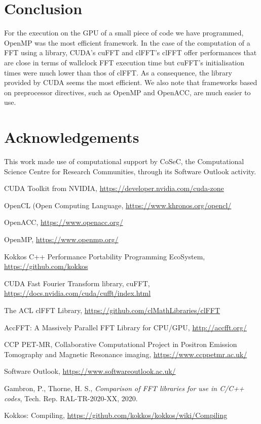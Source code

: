 \documentclass[12pt, a4paper]{article}
\begin{document}
\section{Conclusion}
For the execution on the GPU of a small piece of code we have
programmed, OpenMP was the most efficient framework. In the case of
the computation of a FFT using a library, CUDA's cuFFT and clFFT's
clFFT offer performances that are close in terms of wallclock FFT
execution time but cuFFT's initialisation times were much lower than
thos of clFFT. As a consequence, the library provided by CUDA seems
the most efficient. We also note that frameworks based on preprocessor
directives, such as OpenMP and OpenACC, are much easier to use.

\section*{Acknowledgements}
This work made use of computational support by CoSeC, the
Computational Science Centre for Research Communities, through its
Software Outlook activity.

\begin{thebibliography}{9}

 CUDA Toolkit from NVIDIA, \url{https://developer.nvidia.com/cuda-zone}

 OpenCL (Open Computing Language, \url{https://www.khronos.org/opencl/}

 OpenACC, \url{https://www.openacc.org/}
  
 OpenMP, \url{https://www.openmp.org/}

 Kokkos C++ Performance Portability Programming EcoSystem,
\url{https://github.com/kokkos}

 CUDA Fast Fourier Transform library, cuFFT, \url{https://docs.nvidia.com/cuda/cufft/index.html}

 The ACL clFFT Library, \url{https://github.com/clMathLibraries/clFFT}
  
 AccFFT: A Massively Parallel FFT Library for CPU/GPU, \url{http://accfft.org/}

 CCP PET-MR, Collaborative Computational Project in Positron Emission Tomography and Magnetic Resonance imaging, \url{https://www.ccppetmr.ac.uk/}

 Software Outlook, \url{https://www.softwareoutlook.ac.uk/}

  Gambron, P., Thorne, H. S.,
{\it Comparison of FFT libraries for use in C/C++ codes}, Tech. Rep. RAL-TR-2020-XX, 2020.

 Kokkos: Compiling, \url{https://github.com/kokkos/kokkos/wiki/Compiling}

\end{thebibliography}
\end{document}
